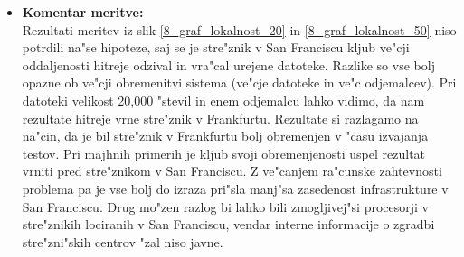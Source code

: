 \begin{itemize}
    \newpage
	\item \textbf{Komentar meritve: } \\
		Rezultati meritev iz slik \ref{8_graf_lokalnost_20} in \ref{8_graf_lokalnost_50} niso potrdili na"se hipoteze, saj se je stre"znik v San Franciscu kljub ve"cji oddaljenosti hitreje odzival in vra"cal urejene datoteke.
		Razlike so vse bolj opazne ob ve"cji obremenitvi sistema (ve"cje datoteke in ve"c odjemalcev). Pri datoteki velikost 20,000 "stevil in enem odjemalcu lahko vidimo, da nam rezultate hitreje vrne stre"znik v Frankfurtu. Rezultate si razlagamo na na"cin, da je bil stre"znik v Frankfurtu bolj obremenjen v "casu izvajanja testov. Pri majhnih primerih je kljub svoji obremenjenosti uspel rezultat vrniti pred stre"znikom v San Franciscu. Z ve"canjem ra"cunske zahtevnosti problema pa je vse bolj do izraza pri"sla manj"sa zasedenost infrastrukture v San Franciscu. Drug mo"zen razlog bi lahko bili zmogljivej"si procesorji v stre"znikih lociranih v San Franciscu, vendar interne informacije o zgradbi stre"zni"skih centrov "zal niso javne.
\end{itemize}

\newpage

